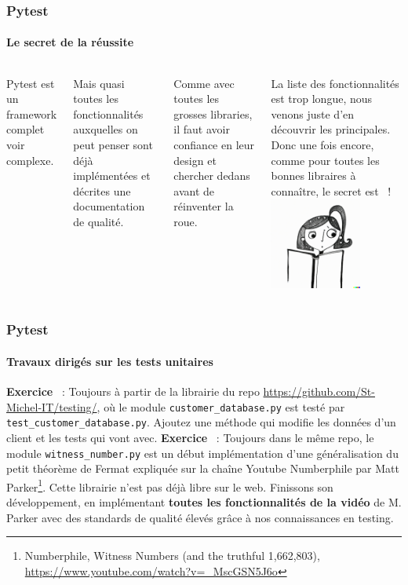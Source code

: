 \documentclass{beamer}
\begin{document}
    \begin{frame}
        \frametitle{Pytest}
        \framesubtitle{Le secret de la réussite}
        \transdissolve
        \begin{columns}
            Pytest est un framework complet voir complexe.

            Mais quasi toutes les fonctionnalités auxquelles on peut penser sont déjà implémentées et décrites une documentation de qualité.

            Comme avec toutes les grosses libraries, il faut avoir confiance en leur design et chercher dedans avant de réinventer la roue.

            La liste des fonctionnalités est trop longue, nous venons juste d'en découvrir les principales.
            \bigbreak
            Donc une fois encore, comme pour toutes les bonnes libraires à connaître, le secret est ~!
            \centering
            \includegraphics[width=3cm]{image/girl-rtfm}
        \end{columns}
    \end{frame}

    \begin{frame}
        \frametitle{Pytest}
        \framesubtitle{Travaux dirigés sur les tests unitaires}
        \transdissolve
        \textbf{Exercice \execcounterdispinc{}}~: Toujours à partir de la librairie du repo \url{https://github.com/St-Michel-IT/testing/}, où le module \lstinline{customer_database.py} est testé par \lstinline{test_customer_database.py}.
        Ajoutez une méthode qui modifie les données d'un client et les tests qui vont avec.
        \bigbreak
        \textbf{Exercice \execcounterdispinc{}}~: Toujours dans le même repo, le module \lstinline{witness_number.py} est un début implémentation d'une généralisation du petit théorème de Fermat expliquée sur la chaîne Youtube Numberphile par Matt Parker\footnote{Numberphile, Witness Numbers (and the truthful 1,662,803), \url{https://www.youtube.com/watch?v=_MscGSN5J6o}}.
        Cette librairie n'est pas déjà libre sur le web.
        Finissons son développement, en implémentant \textbf{toutes les fonctionnalités de la vidéo} de M. Parker avec des standards de qualité élevés grâce à nos connaissances en testing.
    \end{frame}
\end{document}
